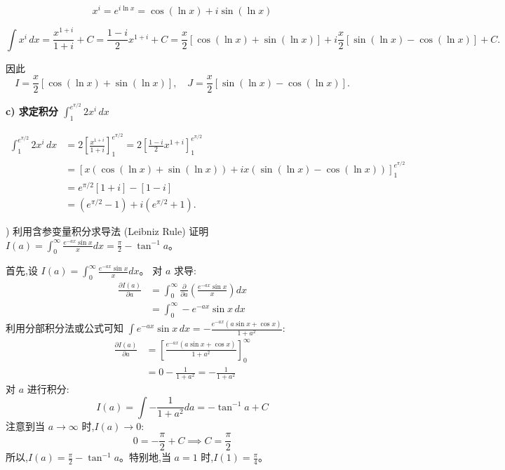 \begin{questions}
\begin{solution}
\[
x^i = e^{i \ln x} = \cos(\ln x) + i \sin(\ln x)
\]

\[
\int x^i \, dx = \frac{x^{1+i}}{1+i} + C
= \frac{1-i}{2} x^{1+i} + C
= \frac{x}{2} [\cos(\ln x) + \sin(\ln x)] + i \frac{x}{2} [\sin(\ln x) - \cos(\ln x)] + C.
\]

因此
\[
I = \frac{x}{2}[\cos(\ln x) + \sin(\ln x)], \quad
J = \frac{x}{2}[\sin(\ln x) - \cos(\ln x)].
\]

\medskip
\textbf{c) 求定积分 $\int_{1}^{e^{\pi/2}} 2 x^i \, dx$}

\begin{align*}
\int_{1}^{e^{\pi/2}} 2 x^i \, dx &= 2 \left[ \frac{x^{1+i}}{1+i} \right]_1^{e^{\pi/2}} 
= 2 \left[ \frac{1-i}{2} x^{1+i} \right]_1^{e^{\pi/2}} \\
&= \left[ x (\cos(\ln x) + \sin(\ln x)) + i x (\sin(\ln x) - \cos(\ln x)) \right]_1^{e^{\pi/2}} \\
&= e^{\pi/2} [1 + i] - [1 - i] \\
&= (e^{\pi/2} - 1) + i (e^{\pi/2} + 1).
\end{align*}

\end{solution}

) 利用含参变量积分求导法 (Leibniz Rule) 证明 $I(a) = \int_{0}^{\infty} \frac{e^{-ax}\sin x}{x} dx = \frac{\pi}{2} - \tan^{-1} a$。

\begin{solution}
首先,设 $I(a) = \int_{0}^{\infty} \frac{e^{-ax}\sin x}{x} dx$。
对 $a$ 求导:
\begin{align*}
\frac{\partial I(a)}{\partial a} &= \int_{0}^{\infty} \frac{\partial}{\partial a} \left( \frac{e^{-ax}\sin x}{x} \right) dx \\
&= \int_{0}^{\infty} -e^{-ax}\sin x \, dx
\end{align*}
利用分部积分法或公式可知 $\int e^{-ax}\sin x \, dx = -\frac{e^{-ax}(a\sin x + \cos x)}{1+a^2}$:
\begin{align*}
\frac{\partial I(a)}{\partial a} &= \left[ \frac{e^{-ax}(a\sin x + \cos x)}{1+a^2} \right]_{0}^{\infty} \\
&= 0 - \frac{1}{1+a^2} = -\frac{1}{1+a^2}
\end{align*}
对 $a$ 进行积分:
\[ I(a) = \int -\frac{1}{1+a^2} da = -\tan^{-1} a + C \]
注意到当 $a \to \infty$ 时,$I(a) \to 0$:
\[ 0 = -\frac{\pi}{2} + C \implies C = \frac{\pi}{2} \]
所以,$I(a) = \frac{\pi}{2} - \tan^{-1} a$。特别地,当 $a=1$ 时,$I(1) = \frac{\pi}{4}$。
\end{solution}


\end{questions}
